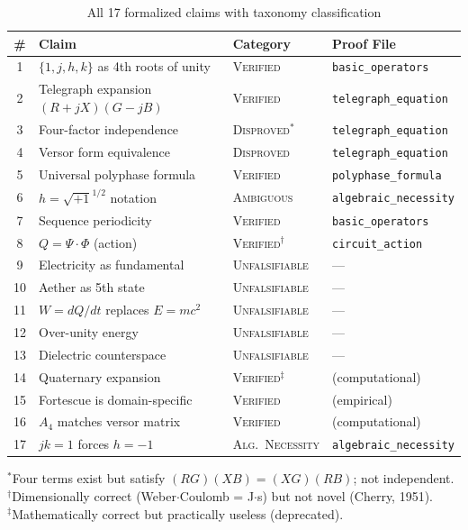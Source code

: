 \documentclass[runningheads]{llncs}
\begin{document}
\begin{table}[ht]
\centering
\caption{All 17 formalized claims with taxonomy classification}
\label{tab:claims}
\small
\begin{tabular}{@{}clll@{}}
\toprule
\textbf{\#} & \textbf{Claim} & \textbf{Category} & \textbf{Proof File} \\
\midrule
1 & $\{1,j,h,k\}$ as 4th roots of unity & \textsc{Verified} & \texttt{basic\_operators} \\
2 & Telegraph expansion $(R+jX)(G-jB)$ & \textsc{Verified} & \texttt{telegraph\_equation} \\
3 & Four-factor independence & \textsc{Disproved}$^*$ & \texttt{telegraph\_equation} \\
4 & Versor form equivalence & \textsc{Disproved} & \texttt{telegraph\_equation} \\
5 & Universal polyphase formula & \textsc{Verified} & \texttt{polyphase\_formula} \\
6 & $h = \sqrt{+1}^{1/2}$ notation & \textsc{Ambiguous} & \texttt{algebraic\_necessity} \\
7 & Sequence periodicity & \textsc{Verified} & \texttt{basic\_operators} \\
8 & $Q = \Psi \cdot \Phi$ (action) & \textsc{Verified}$^\dagger$ & \texttt{circuit\_action} \\
9 & Electricity as fundamental & \textsc{Unfalsifiable} & --- \\
10 & Aether as 5th state & \textsc{Unfalsifiable} & --- \\
11 & $W = dQ/dt$ replaces $E = mc^2$ & \textsc{Unfalsifiable} & --- \\
12 & Over-unity energy & \textsc{Unfalsifiable} & --- \\
13 & Dielectric counterspace & \textsc{Unfalsifiable} & --- \\
14 & Quaternary expansion & \textsc{Verified}$^\ddagger$ & (computational) \\
15 & Fortescue is domain-specific & \textsc{Verified} & (empirical) \\
16 & $A_4$ matches versor matrix & \textsc{Verified} & (computational) \\
17 & $jk=1$ forces $h=-1$ & \textsc{Alg.\ Necessity} & \texttt{algebraic\_necessity} \\
\bottomrule
\end{tabular}

\vspace{0.5em}
{\footnotesize
$^*$Four terms exist but satisfy $(RG)(XB) = (XG)(RB)$; not independent. \\
$^\dagger$Dimensionally correct (Weber$\cdot$Coulomb = J$\cdot$s) but not novel (Cherry, 1951). \\
$^\ddagger$Mathematically correct but practically useless (deprecated).
}
\end{table}
\end{document}

